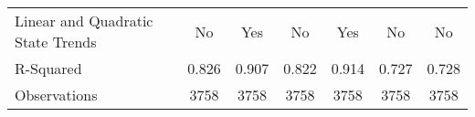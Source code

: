 {\begin{tabular}{l*{6}{c}}
Linear and Quadratic State Trends&          No         &         Yes         &          No         &         Yes         &          No         &          No         \\
R-Squared           &       0.826         &       0.907         &       0.822         &       0.914         &       0.727         &       0.728         \\
Observations        &        3758         &        3758         &        3758         &        3758         &        3758         &        3758         \\
\hline\hline
\end{tabular}
}
